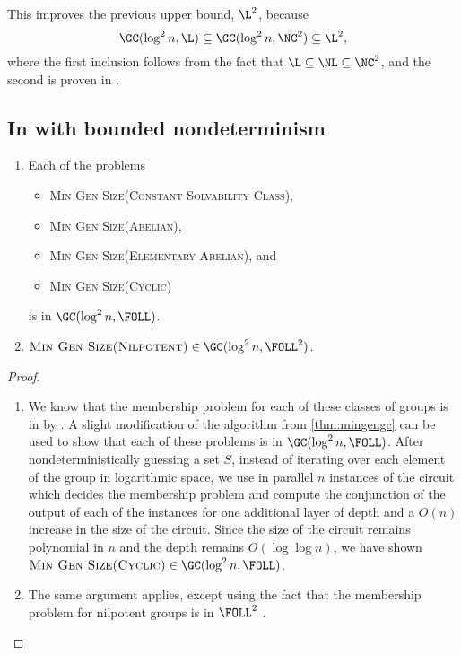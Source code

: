 \documentclass{article}
\begin{document}
This improves the previous upper bound, $\L^2$, because
\begin{equation*}
  \GC(\log^2 n, \L) \subseteq \GC(\log^2 n, \NC^2) \subseteq \L^2,
\end{equation*}
where the first inclusion follows from the fact that $\L \subseteq \NL \subseteq \NC^2$, and the second is proven in \cite[Lemma~3.1]{wolf94}.

\subsection{In \texorpdfstring{\FOLL}{FOLL} with bounded nondeterminism}

\begin{theorem}
  \mbox{}
  \begin{enumerate}
  \item Each of the problems
    \begin{itemize}
    \item \textsc{Min Gen Size(Constant Solvability Class)},
    \item \textsc{Min Gen Size(Abelian)},
    \item \textsc{Min Gen Size(Elementary Abelian)}, and
    \item \textsc{Min Gen Size(Cyclic)}
    \end{itemize}
    is in $\GC(\log^2 n, \FOLL)$.
  \item $\textsc{Min Gen Size(Nilpotent)} \in \GC(\log^2 n, \FOLL^2)$.
  \end{enumerate}
\end{theorem}
\begin{proof}
  \mbox{}
  \begin{enumerate}
  \item
    We know that the membership problem for each of these classes of groups is in \FOLL{} by \cite[Section~3]{bklm01}.
    A slight modification of the algorithm from \autoref{thm:mingengc} can be used to show that each of these problems is in $\GC(\log^2 n, \FOLL)$.
    After nondeterministically guessing a set $S$, instead of iterating over each element of the group in logarithmic space, we use in parallel $n$ instances of the \FOLL{} circuit which decides the membership problem and compute the conjunction of the output of each of the instances for one additional layer of depth and a $O(n)$ increase in the size of the circuit.
    Since the size of the circuit remains polynomial in $n$ and the depth remains $O(\log \log n)$, we have shown $\textsc{Min Gen Size(Cyclic)} \in \GC(\log^2 n, \FOLL)$.
  \item The same argument applies, except using the fact that the membership problem for nilpotent groups is in $\FOLL^2$ \cite[Corollary~3.12]{bklm01}. \qedhere
  \end{enumerate}
\end{proof}
\end{document}
